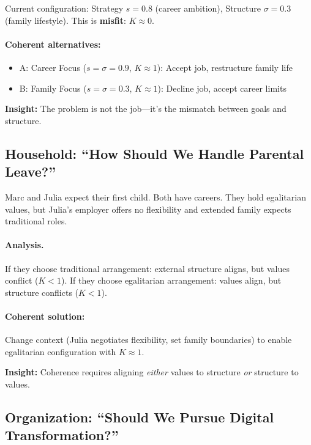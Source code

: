\documentclass[12pt,a4paper]{article}
\begin{document}
Current configuration: Strategy $s = 0.8$ (career ambition), Structure $\sigma = 0.3$ (family lifestyle).
This is \textbf{misfit}: $K \approx 0$.

\paragraph{Coherent alternatives:}
\begin{itemize}
  \item A: Career Focus ($s=\sigma=0.9$, $K \approx 1$): Accept job, restructure family life
  \item B: Family Focus ($s=\sigma=0.3$, $K \approx 1$): Decline job, accept career limits
\end{itemize}

\textbf{Insight:} The problem is not the job---it's the mismatch between goals and structure.

\subsection{Household: ``How Should We Handle Parental Leave?''}

Marc and Julia expect their first child. Both have careers.
They hold egalitarian values, but Julia's employer offers no flexibility 
and extended family expects traditional roles.

\paragraph{Analysis.}
If they choose traditional arrangement: external structure aligns, but values conflict ($K < 1$).
If they choose egalitarian arrangement: values align, but structure conflicts ($K < 1$).

\paragraph{Coherent solution:}
Change context (Julia negotiates flexibility, set family boundaries) 
to enable egalitarian configuration with $K \approx 1$.

\textbf{Insight:} Coherence requires aligning \emph{either} values to structure \emph{or} structure to values.

\subsection{Organization: ``Should We Pursue Digital Transformation?''}
\end{document}
